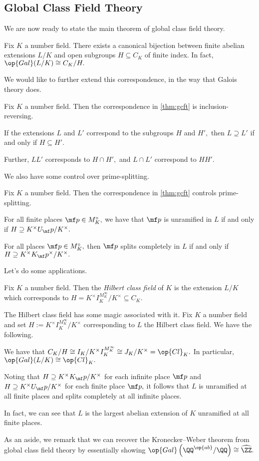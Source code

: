 \subsection{Global Class Field Theory}
We are now ready to state the main theorem of global class field theory.
\begin{theorem} \label{thm:gcft}
	Fix $K$ a number field. There exists a canonical bijection between finite abelian extensions $L/K$ and open subgroups $H\subseteq C_K$ of finite index. In fact, $\op{Gal}(L/K)\cong C_K/H.$
\end{theorem}
We would like to further extend this correspondence, in the way that Galois theory does.
\begin{theorem}
	Fix $K$ a number field. Then the correspondence in \autoref{thm:gcft} is inclusion-reversing.
	\begin{listalph}
		\item If the extensions $L$ and $L'$ correspond to the subgroups $H$ and $H',$ then $L\supseteq L'$ if and only if $H\subseteq H'.$
		\item Further, $LL'$ corresponds to $H\cap H',$ and $L\cap L'$ correspond to $HH'.$
	\end{listalph}
\end{theorem}
We also have some control over prime-splitting.
\begin{theorem}
	Fix $K$ a number field. Then the correspondence in \autoref{thm:gcft} controls prime-splitting.
	\begin{listalph}
		\item For all finite places $\mf p\in M_K^\circ,$ we have that $\mf p$ is unramified in $L$ if and only if $H\supseteq K^\times U_\mf p/K^\times.$
		\item For all places $\mf p\in M_K^\circ,$ then $\mf p$ splits completely in $L$ if and only if $H\supseteq K^\times K_\mf p^\times/K^\times.$ 
	\end{listalph}
\end{theorem}
Let's do some applications.
\begin{definition}
	Fix $K$ a number field. Then the \textit{Hilbert class field} of $K$ is the extension $L/K$ which corresponds to $H=K^\times I_K^{M_K^\infty}/K^\times\subseteq C_K.$
\end{definition}
The Hilbert class field has some magic associated with it. Fix $K$ a number field and set $H:=K^\times I_K^{M_K^\infty}/K^\times$ corresponding to $L$ the Hilbert class field. We have the following.
\begin{listalph}
	\item We have that $C_K/H\cong I_K/K^\times I_K^{M_K^\infty}\cong J_K/K^\times=\op{Cl}_K.$ In particular, $\op{Gal}(L/K)\cong\op{Cl}_K.$
	\item Noting that $H\supseteq K^\times K_\mf p/K^\times$ for each infinite place $\mf p$ and $H\supseteq K^\times U_\mf p/K^\times$ for each finite place $\mf p,$ it follows that $L$ is unramified at all finite places and splits completely at all infinite places.
	\item In fact, we can see that $L$ is the largest abelian extension of $K$ unramified at all finite places.
\end{listalph}
As an aside, we remark that we can recover the Kronecker--Weber theorem from global class field theory by essentially showing $\op{Gal}\left(\QQ^{\op{ab}}/\QQ\right)\cong\widehat{\ZZ}.$
